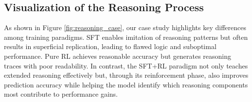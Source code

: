 \subsection{Visualization of the Reasoning Process}



As shown in Figure \ref{fig:reasoning_case}, our case study highlights key differences among training paradigms. SFT enables imitation of reasoning patterns but often results in superficial replication, leading to flawed logic and suboptimal performance. Pure RL achieves reasonable accuracy but generates reasoning traces with poor readability. In contrast, the SFT+RL paradigm not only teaches extended reasoning effectively but, through its reinforcement phase, also improves prediction accuracy while helping the model identify which reasoning components most contribute to performance gains.
